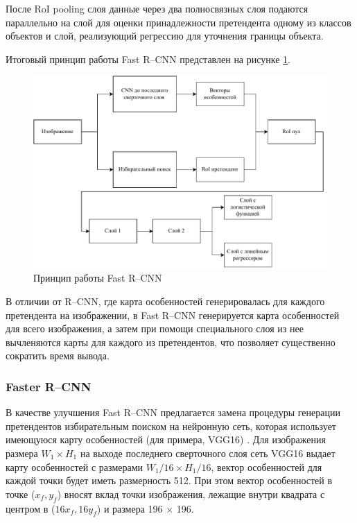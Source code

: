 После RoI pooling слоя данные через два полносвязных слоя подаются параллельно на слой для оценки принадлежности претендента одному из классов объектов и слой, реализующий регрессию для уточнения границы объекта.

Итоговый принцип работы Fast R--CNN представлен на рисунке \ref{fig:fastrcnn}.

\begin{figure}[H]
	\centering
	\includegraphics[width=\textwidth]{img/fastrcnn.pdf}
	\caption{Принцип работы Fast R--CNN}
	\label{fig:fastrcnn}
\end{figure}

В отличии от R--CNN, где карта особенностей генерировалась для каждого претендента на изображении, в Fast R--CNN генерируется карта особенностей для всего изображения, а затем при помощи специального слоя из нее вычленяются карты для каждого из претендентов, что позволяет существенно сократить время вывода.

\subsubsection{Faster R--CNN}

В качестве улучшения Fast R--CNN предлагается замена процедуры генерации претендентов избирательным поиском на нейронную сеть, которая использует имеющуюся карту особенностей (для примера, VGG16) \cite{fasterrcnn}. Для изображения размера $W_1 \times H_1$ на выходе последнего сверточного слоя сеть VGG16 выдает карту особенностей с размерами $W_1/16 \times H_1/16$, вектор особенностей для каждой точки будет иметь размерность 512. При этом вектор особенностей в точке ($x_f, y_f$) вносят вклад точки изображения, лежащие внутри квадрата с центром в ($16x_f, 16y_f$) и размера 196 $\times$ 196.

